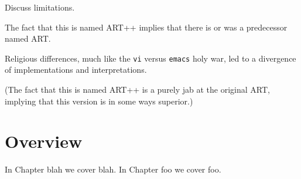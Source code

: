 Discuss limitations.  

The fact that this is named ART++ implies that there is or was a 
predecessor named ART.  

Religious differences, much like the
\texttt{vi} versus \texttt{emacs} holy war, 
led to a divergence of implementations and interpretations.  

(The fact that this is named ART++ is a purely jab at the original ART, 
implying that this version is in some ways superior.)

\section{Overview}
\label{sec:intro:overview}

In Chapter blah we cover blah.  
In Chapter foo we cover foo.  


